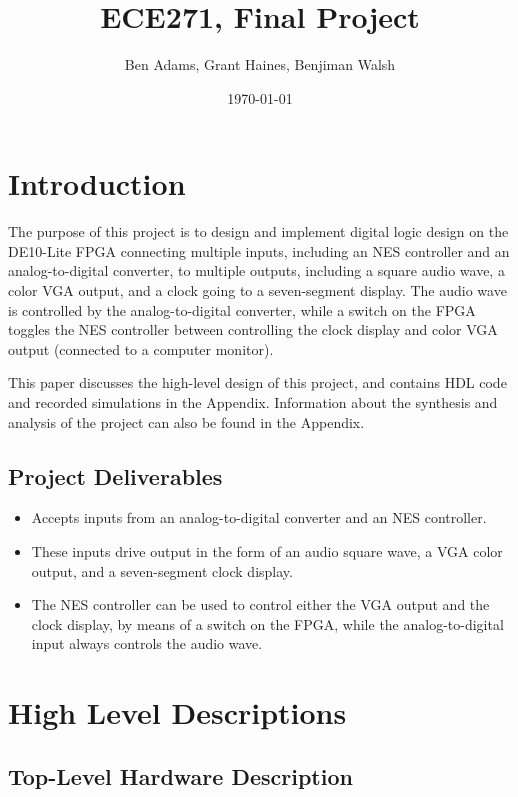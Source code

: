 \documentclass[a4paper]{article}
\title{ECE271, Final Project}
\author{Ben Adams, Grant Haines, Benjiman Walsh}
\date{\today}
\begin{document}
\maketitle

\pagebreak

\tableofcontents

\pagebreak

\section{Introduction}

The purpose of this project is to design and implement digital logic design on the DE10-Lite FPGA connecting multiple inputs, including an NES controller and an analog-to-digital converter, to multiple outputs, including a square audio wave, a color VGA output, and a clock going to a seven-segment display. The audio wave is controlled by the analog-to-digital converter, while a switch on the FPGA toggles the NES controller between controlling the clock display and color VGA output (connected to a computer monitor).

This paper discusses the high-level design of this project, and contains HDL code and recorded simulations in the Appendix. Information about the synthesis and analysis of the project can also be found in the Appendix.

\subsection{Project Deliverables}

\begin{itemize}
	\item Accepts inputs from an analog-to-digital converter and an NES controller.
	\item These inputs drive output in the form of an audio square wave, a VGA color output, and a seven-segment clock display.
	\item The NES controller can be used to control either the VGA output and the clock display, by means of a switch on the FPGA, while the analog-to-digital input always controls the audio wave.
\end{itemize}

\section{High Level Descriptions}%

\subsection{Top-Level Hardware Description}
\end{document}
